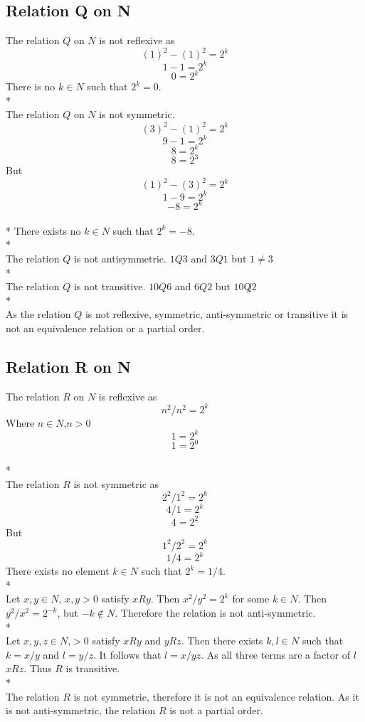 \documentclass[a4paper,12pt]{article}
\begin{document}
\subsection{Relation Q on N}
The relation $Q$ on $N$ is not reflexive as \[(1)^2 - (1)^2 = 2^k\]
\[1 - 1 = 2^k\]
\[0 = 2^k\]
There is no $k \in N$ such that $2^k = 0$.
\\*
\\
The relation $Q$ on $N$ is not symmetric. \[(3)^2 - (1)^2 = 2^k\]
\[9 -1 = 2^k\]
\[8 = 2^k\]
\[8 = 2^3\]
But \[(1)^2 - (3)^2 = 2^k\]
\[1 - 9 = 2^k\]
\[ -8 = 2^k \]
\\*
There exists no $k \in N$ such that $2^k = -8$.
\\*
\\
The relation $Q$ is not antisymmetric. $1Q3$ and $3Q1$ but $ 1 \not= 3$
\\* 
\\
The relation $Q$ is not transitive. $10Q6$ and $6Q2$ but $10\not Q 2$
\\*
\\
As the relation $Q$ is not reflexive, symmetric, anti-symmetric or transitive it is not an equivalence 
relation or a partial order.
\subsection{Relation R on N}
The relation $R$ on $N$ is reflexive as \[n^2 / n^2 = 2^k\]
Where $n \in N$,$n > 0$
\[1 = 2^k\]
\[1 = 2^0\]
\\*
\\
The relation $R$ is not symmetric as \[ 2^2 / 1^2 = 2^k\]
\[4 / 1 = 2^k\]
\[ 4 = 2^2\]
But \[ 1^2 / 2^2 = 2^k\]
\[ 1 / 4 = 2^k\]
There exists no element $k \in N$ such that $2^k = 1/4$.
\\*
\\
Let $x,y \in N$, $x,y > 0$ satisfy $xRy$. Then $x^2 / y^2 = 2^k$ for some $k \in N$.
Then $y^2 / x^2 = 2^{-k}$, but $-k \notin N$. Therefore the relation is not anti-symmetric.
\\*
\\
Let $x,y,z \in N$,$>0$ satisfy $xRy$ and $yRz$. Then there exists $k,l \in N$ such that $k = x / y$ and $l = y / z$.
It follows that $l = x / yz$. As all three terms are a factor of $l$ $xRz$. Thus $R$ is transitive.
\\*
\\
The relation $R$ is not symmetric, therefore it is not an equivalence relation.
As it is not anti-symmetric, the relation $R$ is not a partial order.
\end{document}
